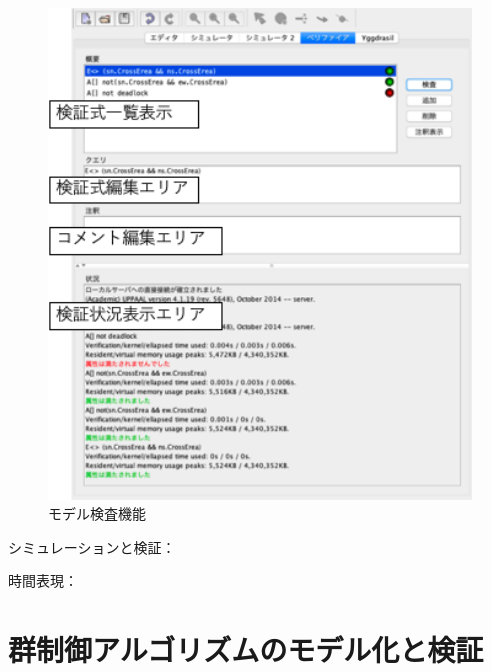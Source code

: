 \documentclass{tpu-sotu}
\begin{document}
	\begin{figure}[htbp]
	\centering
	\includegraphics[width=140mm]{showModelVerification.png}
	\caption{モデル検査機能}
	\label{sMV}
	\end{figure}
	シミュレーションと検証：
	
	時間表現：
	
\chapter{群制御アルゴリズムのモデル化と検証}
\end{document}
